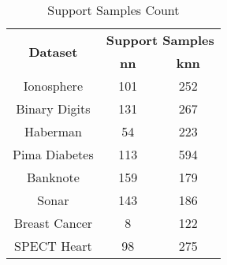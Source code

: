 \begin{table}[htbp]
\caption{Support Samples Count}
\begin{center}
\begin{tabular}{|c|c|c|}
\hline
\multirow{2}{*}{\textbf{Dataset}} & \multicolumn{2}{c|}{\textbf{Support Samples}} \\ \cline{2-3}
 & \textbf{nn} & \textbf{knn} \\ \hline
Ionosphere & 101 & 252 \\ \hline
Binary Digits & 131 & 267 \\ \hline
Haberman & 54 & 223 \\ \hline
Pima Diabetes & 113 & 594 \\ \hline
Banknote & 159 & 179 \\ \hline
Sonar & 143 & 186 \\ \hline
Breast Cancer & 8 & 122 \\ \hline
SPECT Heart & 98 & 275 \\ \hline
\end{tabular}
\label{tab:support}
\end{center}
\end{table}
